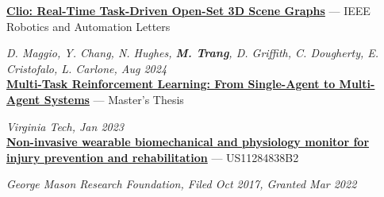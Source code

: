 
\href{https://ieeexplore.ieee.org/document/10659066}{\textbf{Clio: Real-Time Task-Driven Open-Set 3D Scene Graphs}} --- IEEE Robotics and Automation Letters

\textit{D. Maggio, Y. Chang, N. Hughes, \textbf{M. Trang}, D. Griffith, C. Dougherty, E. Cristofalo, L. Carlone, Aug 2024} \\


\href{https://vtechworks.lib.vt.edu/items/bcd82abe-909b-4b69-9313-caa6b431e45b}{\textbf{Multi-Task Reinforcement Learning: From Single-Agent to Multi-Agent Systems}} --- Master's Thesis

\textit{Virginia Tech, Jan 2023} \\


\href{https://patents.google.com/patent/US11284838B2/en?inventor=matthew+trang&oq=matthew+trang}{\textbf{Non-invasive wearable biomechanical and physiology monitor for injury prevention and rehabilitation}} --- US11284838B2

\textit{George Mason Research Foundation, Filed Oct 2017, Granted Mar 2022} \\




